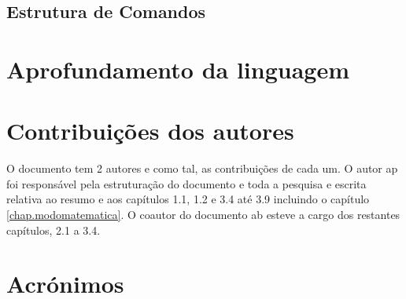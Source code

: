 \documentclass{report}
\begin{document}
\section{Estrutura de Comandos}
\label{chap.estruturadecomandos}


\chapter{Aprofundamento da linguagem}



\chapter*{Contribuições dos autores}
O documento tem 2 autores e como tal, as contribuições de cada um. O autor \ac{ap} foi responsável pela estruturação do documento e toda a pesquisa e escrita relativa ao resumo e aos capítulos 1.1, 1.2 e 3.4 até 3.9 incluindo o capítulo \autoref{chap.modomatematica}. O coautor do documento \ac{ab} esteve a cargo dos restantes capítulos, 2.1 a 3.4.

\chapter*{Acrónimos}
\begin{acronym}

\end{acronym}


\printbibliography
\end{document}
